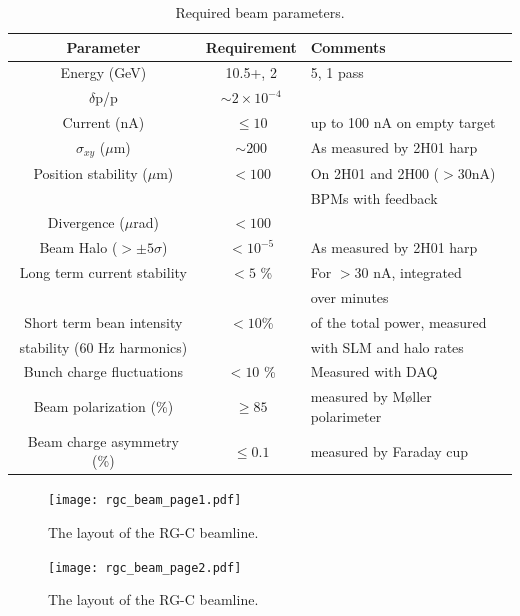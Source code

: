 \documentclass[12pt]{article}
\begin{document}
 \begin{table}[htb]
\caption{Required beam parameters.}\label{tab:beam_par}
\centering
 \begin{tabular}{|c|c|l|}
\hline
Parameter & Requirement &Comments \\ \hline 
Energy (GeV) & 10.5+, 2   & 5, 1 pass  \\  \hline
$\delta$p/p & $\sim 2\times 10^{-4}$ & \\ \hline 
Current (nA) & $\le 10$ &up to 100 nA on empty target  \\  \hline
$\sigma_{xy}$ ($\mu$m) &$ \sim 200$& As measured by 2H01 harp \\ \hline 
Position stability ($\mu$m) & $< 100$ & On 2H01 and 2H00 ($>30$nA) \\ 
&&BPMs with feedback \\ \hline
Divergence ($\mu$rad) & $< 100$&  \\ \hline 
Beam Halo ($> \pm 5\sigma$) &$< 10^{-5}$&As measured by 2H01 harp \\ \hline
Long term current stability & $< 5$ \% & For $>30$ nA, integrated \\
&&over minutes \\ \hline 
Short term bean intensity & $<10$\%& of the total power, measured \\stability (60 Hz harmonics) && with SLM and halo rates \\ \hline
Bunch charge fluctuations &$< 10$ \% & Measured with DAQ \\ \hline
Beam polarization (\%)&$\ge 85$&measured by M\o{}ller polarimeter \\ \hline
Beam charge asymmetry (\%) &$\le 0.1$& measured by Faraday cup\\
\hline
 \end{tabular}
\end{table}

\begin{figure}[hbt]
\vspace{-2cm}
\begin{center}
\texttt{[image: rgc\_beam\_page1.pdf]}
\caption{ \label{fig:beamline1} The layout of the RG-C beamline. }
\end{center}
\end{figure}

\begin{figure}[hbt]
\vspace{-2cm}
\begin{center}
\texttt{[image: rgc\_beam\_page2.pdf]}
\end{center}
\caption{ \label{fig:beamline2} 
The layout of the RG-C beamline. }
\end{figure}
\end{document}
